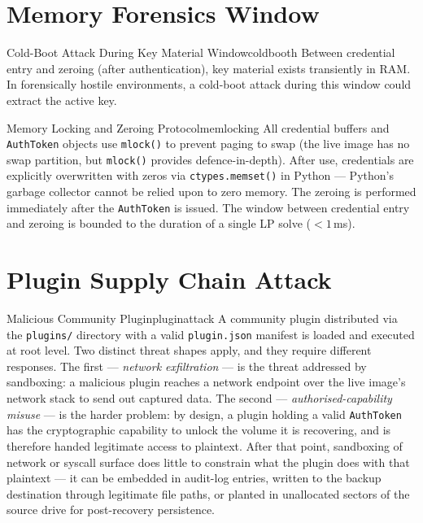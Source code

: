 \documentclass[11pt,a4paper]{report}
\begin{document}
\section{Memory Forensics Window}

\begin{edgecase}{Cold-Boot Attack During Key Material Window}{coldbooth}
Between credential entry and zeroing (after authentication), key material exists transiently in RAM. In forensically hostile environments, a cold-boot attack during this window could extract the active key.
\end{edgecase}

\begin{solution}{Memory Locking and Zeroing Protocol}{memlocking}
All credential buffers and \texttt{AuthToken} objects use \texttt{mlock()} to prevent paging to swap (the live image has no swap partition, but \texttt{mlock()} provides defence-in-depth). After use, credentials are explicitly overwritten with zeros via \texttt{ctypes.memset()} in Python --- Python's garbage collector cannot be relied upon to zero memory. The zeroing is performed immediately after the \texttt{AuthToken} is issued. The window between credential entry and zeroing is bounded to the duration of a single LP solve ($< 1$\,ms).
\end{solution}

\section{Plugin Supply Chain Attack}

\begin{edgecase}{Malicious Community Plugin}{pluginattack}
A community plugin distributed via the \texttt{plugins/} directory with a valid \texttt{plugin.json} manifest is loaded and executed at root level. Two distinct threat shapes apply, and they require different responses. The first --- \emph{network exfiltration} --- is the threat addressed by sandboxing: a malicious plugin reaches a network endpoint over the live image's network stack to send out captured data. The second --- \emph{authorised-capability misuse} --- is the harder problem: by design, a plugin holding a valid \texttt{AuthToken} has the cryptographic capability to unlock the volume it is recovering, and is therefore handed legitimate access to plaintext. After that point, sandboxing of network or syscall surface does little to constrain what the plugin does with that plaintext --- it can be embedded in audit-log entries, written to the backup destination through legitimate file paths, or planted in unallocated sectors of the source drive for post-recovery persistence.
\end{edgecase}
\end{document}
